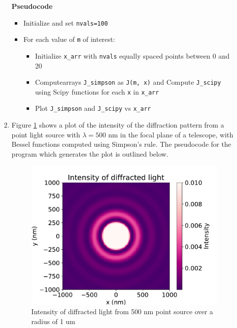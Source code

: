 \documentclass{article}
\newcommand{\code}{\texttt}
\begin{document}
\begin{enumerate}
\begin{enumerate}
    \textbf{Pseudocode}
    \begin{itemize}
        \item Initialize and set \code{nvals=100}
        \item For each value of \code{m} of interest:
        \begin{itemize}
            \item Initialize \code{x\_arr} with \code{nvals} equally spaced points between 0 and 20
            \item Computearrays \code{J\_simpson} as \code{J(m, x)} and Compute \code{J\_scipy} using Scipy functions for each \code{x} in \code{x\_arr}
            \item Plot \code{J\_simpson} and \code{J\_scipy} vs \code{x\_arr}
        \end{itemize}
    \end{itemize}

    \item Figure \ref{fig:1c} shows a plot of the intensity of the diffraction pattern from a point light source with $\lambda=500$ nm in the focal plane of a telescope, with Bessel functions computed using Simpson's rule. The pseudocode for the program which generates the plot is outlined below.
    
    \begin{figure}[H]
        \centering
        \includegraphics[width=0.6\linewidth]{1c.pdf}
        \caption{\label{fig:1c} Intensity of diffracted light from 500 nm point source over a radius of 1 um}
    \end{figure} 


\end{enumerate}
\end{enumerate}
\end{document}
